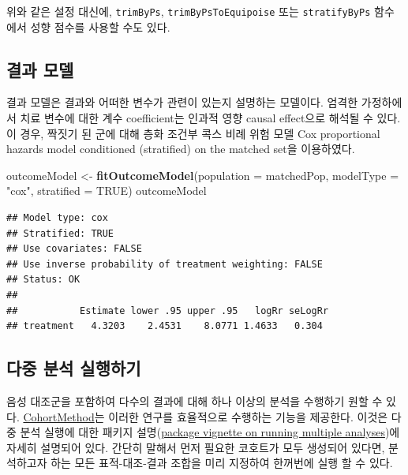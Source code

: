 \documentclass[10.5pt]{book}
\newenvironment{Shaded}{\begin{snugshade}}{\end{snugshade}}
\newcommand{\KeywordTok}[1]{\textcolor[rgb]{0.13,0.29,0.53}{\textbf{#1}}}
\newcommand{\DataTypeTok}[1]{\textcolor[rgb]{0.13,0.29,0.53}{#1}}
\newcommand{\StringTok}[1]{\textcolor[rgb]{0.31,0.60,0.02}{#1}}
\newcommand{\OtherTok}[1]{\textcolor[rgb]{0.56,0.35,0.01}{#1}}
\newcommand{\NormalTok}[1]{#1}
\theoremstyle{definition}
\theoremstyle{definition}
\theoremstyle{definition}
\theoremstyle{remark}
\begin{document}
위와 같은 설정 대신에, \texttt{trimByPs}, \texttt{trimByPsToEquipoise}
또는 \texttt{stratifyByPs} 함수에서 성향 점수를 사용할 수도 있다.

\subsection{결과 모델}\label{-}

결과 모델은 결과와 어떠한 변수가 관련이 있는지 설명하는 모델이다. 엄격한
가정하에서 치료 변수에 대한 계수 coefficient는 인과적 영향 causal
effect으로 해석될 수 있다. 이 경우, 짝짓기 된 군에 대해 층화 조건부 콕스
비례 위험 모델 Cox proportional hazards model conditioned (stratified)
on the matched set을 이용하였다.

\begin{Shaded}
\begin{Highlighting}[]
\NormalTok{outcomeModel <-}\StringTok{ }\KeywordTok{fitOutcomeModel}\NormalTok{(}\DataTypeTok{population =}\NormalTok{ matchedPop,}
                                \DataTypeTok{modelType =} \StringTok{"cox"}\NormalTok{,}
                                \DataTypeTok{stratified =} \OtherTok{TRUE}\NormalTok{)}
\NormalTok{outcomeModel}
\end{Highlighting}
\end{Shaded}

\begin{verbatim}
## Model type: cox
## Stratified: TRUE
## Use covariates: FALSE
## Use inverse probability of treatment weighting: FALSE
## Status: OK
## 
##           Estimate lower .95 upper .95   logRr seLogRr
## treatment   4.3203    2.4531    8.0771 1.4633   0.304
\end{verbatim}

\subsection{다중 분석 실행하기}\label{MultipleAnalyses}

음성 대조군을 포함하여 다수의 결과에 대해 하나 이상의 분석을 수행하기
원할 수 있다.
\href{https://ohdsi.github.io/CohortMethod/}{CohortMethod}는 이러한
연구를 효율적으로 수행하는 기능을 제공한다. 이것은 다중 분석 실행에 대한
패키지
설명(\href{https://ohdsi.github.io/CohortMethod/articles/MultipleAnalyses.html}{package
vignette on running multiple analyses})에 자세히 설명되어 있다. 간단히
말해서 먼저 필요한 코호트가 모두 생성되어 있다면, 분석하고자 하는 모든
표적-대조-결과 조합을 미리 지정하여 한꺼번에 실행 할 수 있다.
\end{document}
